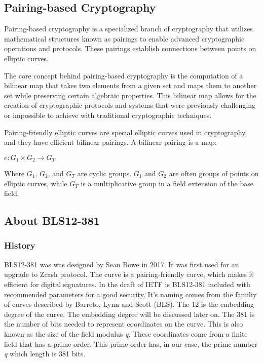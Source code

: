 \documentclass{article}
\begin{document}
\subsection{Pairing-based Cryptography}

Pairing-based cryptography is a specialized branch of cryptography that utilizes mathematical structures known as pairings to enable advanced cryptographic operations and protocols. These pairings establish connections between points on elliptic curves.

The core concept behind pairing-based cryptography is the computation of a bilinear map that takes two elements from a given set and maps them to another set while preserving certain algebraic properties. This bilinear map allows for the creation of cryptographic protocols and systems that were previously challenging or impossible to achieve with traditional cryptographic techniques.

Pairing-friendly elliptic curves are special elliptic curves used in cryptography, and they have efficient bilinear pairings. A bilinear pairing is a map:
\begin{center}
\(e:G_1\times G_2 \xrightarrow{} G_T\)
\end{center}
Where \(G_1\), \(G_2\), and \(G_T\) are cyclic groups. \(G_1\) and \(G_2\) are often groups of points on elliptic curves, while \(G_T\) is a multiplicative group in a field extension of the base field.

\subsection{About BLS12-381}

\subsubsection{History}

BLS12-381 was was designed by Sean Bowe in 2017. It was first used for an upgrade to Zcash protocol. The curve is a pairing-friendly curve, which makes it efficient for digital signatures. In the draft of IETF is BLS12-381 included with recommended parameters for a good security. \newline
It's naming comes from the familiy of curves described by Barreto, Lynn and Scott (BLS). The 12 is the embedding degree of the curve. The embedding degree will be discussed later on. The 381 is the number of bits needed to represent coordinates on the curve. This is also known as the size of the field modulus \textit{q}. These coordinates come from a finite field that has a prime order. This prime order has, in our case, the prime number \textit{q} which length is 381 bits.
\end{document}
